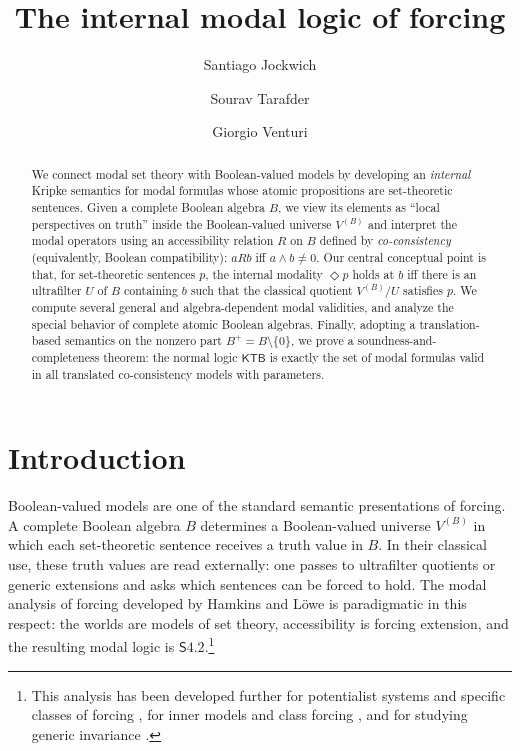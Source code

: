 \documentclass[11pt]{amsart}
\title{The internal modal logic of forcing}
\author{Santiago Jockwich \and Sourav Tarafder \and Giorgio Venturi}
\date{}
\theoremstyle{definition}
\theoremstyle{plain}
\newcommand{\KTB}{\mathsf{KTB}}
\begin{document}
\begin{abstract}
We connect modal set theory with Boolean-valued models by developing an \emph{internal}
Kripke semantics for modal formulas whose atomic propositions are set-theoretic sentences.
Given a complete Boolean algebra $B$, we view its elements as ``local perspectives on truth''
inside the Boolean-valued universe $V^{(B)}$ and interpret the modal operators using an
accessibility relation $R$ on $B$ defined by \emph{co-consistency} (equivalently, Boolean
compatibility): $aRb$ iff $a\wedge b\neq 0$.
Our central conceptual point is that, for set-theoretic sentences $p$, the internal modality
$\Diamond p$ holds at $b$
iff there is an ultrafilter $U$ of $B$ containing $b$ such that the classical quotient
$V^{(B)}/U$ satisfies $p$. We compute several general and algebra-dependent modal validities,
and analyze the special behavior of complete atomic Boolean algebras.
Finally, adopting a translation-based semantics on the nonzero part $B^+=B\setminus\{0\}$,
we prove a soundness-and-completeness theorem:
the normal logic $\KTB$ is exactly the set of modal formulas valid in all translated
co-consistency models with parameters.
\end{abstract}

\maketitle

\section{Introduction}

Boolean-valued models are one of the standard semantic presentations of forcing. A complete
Boolean algebra $B$ determines a Boolean-valued universe $V^{(B)}$ in which each set-theoretic
sentence receives a truth value in $B$. In their classical use, these truth values are read externally:
one passes to ultrafilter quotients or generic extensions and asks which sentences can be forced to
hold. The modal analysis of forcing developed by Hamkins and L\"owe \cite{HamkinsLowe} is paradigmatic in this
respect: the worlds are models of set theory, accessibility is forcing extension, and the resulting
modal logic is $\mathsf{S4.2}$.\footnote{This analysis has been developed further for potentialist systems and specific classes of forcing \cite{HamkinsLinnebo, HamkinsLeibmanLow}, for inner models and class forcing \cite{InamdarLoewe2016, BartonWilliams}, and for studying generic invariance \cite{EsakiaLoewe2012, GilbertVenturi2021}.}
\end{document}
